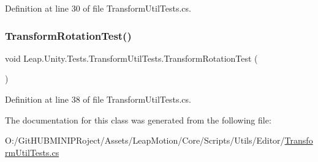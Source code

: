 Definition at line 30 of file Transform\+Util\+Tests.\+cs.

\mbox{\label{class_leap_1_1_unity_1_1_tests_1_1_transform_util_tests_af0a56cc42f436b16a73730c2e848c11a}} 
\subsubsection{\texorpdfstring{TransformRotationTest()}{TransformRotationTest()}}
{\footnotesize\ttfamily void Leap.\+Unity.\+Tests.\+Transform\+Util\+Tests.\+Transform\+Rotation\+Test (\begin{DoxyParamCaption}{ }\end{DoxyParamCaption})}



Definition at line 38 of file Transform\+Util\+Tests.\+cs.



The documentation for this class was generated from the following file\+:\begin{DoxyCompactItemize}
\item 
O\+:/\+Git\+H\+U\+B\+M\+I\+N\+I\+P\+Roject/\+Assets/\+Leap\+Motion/\+Core/\+Scripts/\+Utils/\+Editor/\mbox{\hyperlink{_transform_util_tests_8cs}{Transform\+Util\+Tests.\+cs}}\end{DoxyCompactItemize}
